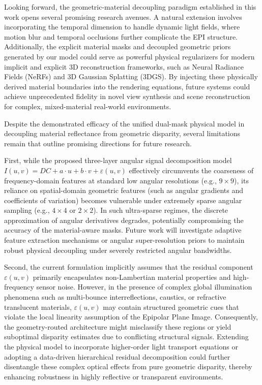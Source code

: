 \documentclass[lettersize,journal]{IEEEtran}
\begin{document}
Looking forward, the geometric-material decoupling paradigm established in this work opens several promising research avenues. A natural extension involves incorporating the temporal dimension to handle dynamic light fields, where motion blur and temporal occlusions further complicate the EPI structure. Additionally, the explicit material masks and decoupled geometric priors generated by our model could serve as powerful physical regularizers for modern implicit and explicit 3D reconstruction frameworks, such as Neural Radiance Fields (NeRFs) and 3D Gaussian Splatting (3DGS). By injecting these physically derived material boundaries into the rendering equations, future systems could achieve unprecedented fidelity in novel view synthesis and scene reconstruction for complex, mixed-material real-world environments.

Despite the demonstrated efficacy of the unified dual-mask physical model in decoupling material reflectance from geometric disparity, several limitations remain that outline promising directions for future research. 

First, while the proposed three-layer angular signal decomposition model $I(u,v) = DC + a\cdot u + b\cdot v + \varepsilon(u,v)$ effectively circumvents the coarseness of frequency-domain features at standard low angular resolutions (e.g., $9 \times 9$), its reliance on spatial-domain geometric features (such as angular gradients and coefficients of variation) becomes vulnerable under extremely sparse angular sampling (e.g., $4 \times 4$ or $2 \times 2$). In such ultra-sparse regimes, the discrete approximation of angular derivatives degrades, potentially compromising the accuracy of the material-aware masks. Future work will investigate adaptive feature extraction mechanisms or angular super-resolution priors to maintain robust physical decoupling under severely restricted angular bandwidths.

Second, the current formulation implicitly assumes that the residual component $\varepsilon(u,v)$ primarily encapsulates non-Lambertian material properties and high-frequency sensor noise. However, in the presence of complex global illumination phenomena such as multi-bounce interreflections, caustics, or refractive translucent materials, $\varepsilon(u,v)$ may contain structured geometric cues that violate the local linearity assumption of the Epipolar Plane Image. Consequently, the geometry-routed architecture might misclassify these regions or yield suboptimal disparity estimates due to conflicting structural signals. Extending the physical model to incorporate higher-order light transport equations or adopting a data-driven hierarchical residual decomposition could further disentangle these complex optical effects from pure geometric disparity, thereby enhancing robustness in highly reflective or transparent environments.
\end{document}

